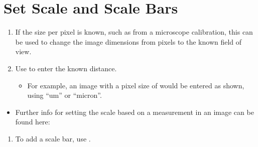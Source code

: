 \documentclass[letterpaper,10pt,english]{jupyterBook}
\begin{document}
\section{Set Scale and Scale Bars}
\label{\detokenize{basics:set-scale-and-scale-bars}}\begin{enumerate}
%
\item {} 
\sphinxAtStartPar
If the size per pixel is known, such as from a microscope calibration, this can be
used to change the image dimensions from pixels to the known field of view.

\item {} 
\sphinxAtStartPar
Use  to enter the known distance.
\begin{itemize}
\item {} 
\sphinxAtStartPar
For example, an image with a pixel size of  would be entered as shown, using “um” or “micron”.

\end{itemize}

\end{enumerate}

\sphinxAtStartPar
{}
\begin{itemize}
\item {} 
\sphinxAtStartPar
Further info for setting the scale based on a measurement in an image can be found here:\\

\end{itemize}
\begin{enumerate}
%
\setcounter{enumi}{2}
\item {} 
\sphinxAtStartPar
To add a scale bar, use .

\end{enumerate}

\sphinxAtStartPar
{}
\end{document}
